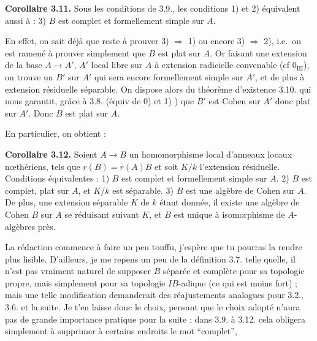 \documentclass[11pt,a4paper]{article}
\begin{document}
 \textbf{Corollaire 3.11.} Sous les conditions de 3.9.,
 les conditions 1) et 2)
équivalent aussi à : 3) $B$ est complet et formellement simple sur $A$.

En effet, on sait déjà que  reste à prouver
 3) $\Rightarrow$ 1) 
 ou encore 3) $\Rightarrow$ 2), i.e.\ on est ramené à
prouver simplement que $B$ est plat sur $A$. Or \struck{\ill{}} faisant une
extension de la base $A \to A'$, $A'$ local  libre sur $A$ à
extension radicielle convenable (cf $0_{\mathrm{III}}$), on trouve un $B'$
 sur $A'$ qui sera encore formellement simple sur $A'$, et de plus
à extension résiduelle  séparable. On dispose alors du
théorème d'existence 3.10. qui nous garantit, grâce à 3.8. (équiv de 0) et
1) ) que $B'$ est Cohen sur $A'$ donc plat sur $A'$. Donc $B$ est plat sur
$A$.



En particulier, on obtient :

\textbf{Corollaire 3.12.} Soient $A \to B$ un homomorphisme local d'anneaux
locaux nœthériens, tels que $r(B) = r(A)B$ et  soit
$K/k$ l'extension résiduelle. Conditions équivalentes : 1) $B$ est complet et
formellement simple sur $A$. 2) $B$ est complet, plat sur $A$, et $K/k$ est
séparable. 3) $B$ est une algèbre de Cohen sur $A$. De plus, une extension
séparable $K$ de $k$ étant donnée, il existe une algèbre de Cohen $B$ sur $A$
se réduisant suivant $K$, et $B$ est unique à isomorphisme de $A$-algèbres
près.

La rédaction commence à faire un peu touffu, j'espère que tu pourras la rendre
plus lisible. D'ailleurs, je me repens un peu de la définition 3.7. telle
quelle, il n'est pas vraiment naturel de supposer $B$ séparée et complète pour
sa topologie propre, mais simplement pour sa topologie $IB$-adique (ce qui est
moins fort) ; mais une telle modification demanderait des réajustements
analogues pour 3.2., 3.6. et la suite. Je t'en laisse donc le choix, pensant
que le choix adopté n'aura pas de grande importance pratique pour la suite :
dans 3.9. à 3.12. cela obligera simplement à supprimer à certains endroits le
mot ``complet'', 
\end{document}
